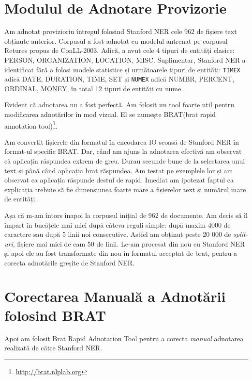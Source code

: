 
\section{Modulul de Adnotare Provizorie}

Am adnotat provizioriu întregul folosind Stanford NER cele 962 de fișiere text obținute anterior. Corpusul a fost adnotat cu modelul antrenat pe corpusul Retures propus de ConLL-2003. Adică, a avut cele 4 tipuri de entități clasice: PERSON, ORGANIZATION, LOCATION, MISC. Suplimentar, Stanford NER a identificat fără a folosi modele statistice și următoarele tipuri de entități: \texttt{TIMEX} adică DATE, DURATION, TIME, SET și \texttt{NUMEX} adică NUMBR, PERCENT, ORDINAL, MONEY, în total 12 tipuri de entități cu nume.

Evident că adnotarea nu a fost perfectă. Am folosit un tool foarte util pentru modificarea adnotărilor în mod vizual. El se numește BRAT(brat rapid annotation tool)\footnote{\url{http://brat.nlplab.org}}.

Am convertit fișierele din formatul în encodarea IO scoasă de Stanford NER în format-ul specific BRAT. Dar, când am ajuns la adnotarea efectivă am observat că aplicația răspundea extrem de greu. Durau secunde bune de la selectarea unui text și până când aplicația brat răspundea. Am testat pe exemplele lor și am observat ca aplicația răspunde destul de rapid. Imediat am ipotezat faptul ca explicația trebuie să fie dimensiunea foarte mare a fișierelor text și numărul mare de entități.

Așa că m-am întors înapoi la corpusul inițial de 962 de documente. Am decis să îl împart în bucățele mai mici după câteva reguli simple: după maxim 4000 de caractere sau după 5 linii noi consecutive. Astfel am obținut peste 20 000 de \textit{split-uri}, fișiere mai mici de cam 50 de linii. Le-am procesat din nou cu Stanford NER și apoi ele au fost transformate din nou în formatul acceptat de brat, pentru a corecta adnotările greșite de Stanford NER.

\section{Corectarea Manuală a Adnotării folosind BRAT}

Apoi am folosit Brat Rapid Adnotation Tool pentru a corecta \textit{manual} adnotarea realizată de către Stanford NER.

